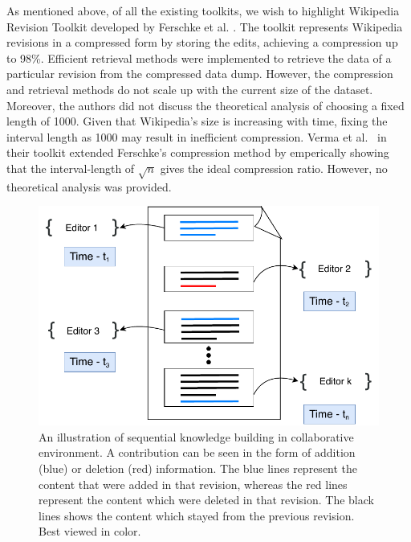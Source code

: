 \documentclass[acmsmall]{acmart}
\begin{document}
As mentioned above, of all the existing toolkits, we wish to highlight Wikipedia Revision Toolkit developed by Ferschke et al. \cite{ferschke2011wikipedia}. The toolkit represents Wikipedia revisions in a compressed form by storing the edits, achieving a compression up to 98\%. Efficient retrieval methods were implemented to retrieve the data of a particular revision from the compressed data dump. However, the compression and retrieval methods do not scale up with the current size of the dataset. Moreover, the authors did not discuss the theoretical analysis of choosing a fixed length of 1000. Given that Wikipedia's size is increasing with time, fixing the interval length as 1000 may result in inefficient compression. Verma et al.~\cite{verma2021open} in their toolkit extended Ferschke's compression method by emperically showing that the interval-length of $\sqrt{n}$ gives the ideal compression ratio. However, no theoretical analysis was provided.


\begin{figure}
    \centering
    \includegraphics[scale=0.7]{sequential_knowledge.pdf}
    \caption{An illustration of sequential knowledge building in collaborative environment. A contribution can be seen in the form of addition (blue) or deletion (red) information. The blue lines represent the content that were added in that revision, whereas the red lines represent the content which were deleted in that revision. The black lines shows the content which stayed from the previous revision. Best viewed in color.}
    \label{fig:seq}
\end{figure}
\end{document}
